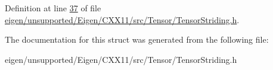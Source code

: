 Definition at line \hyperlink{eigen_2unsupported_2_eigen_2_c_x_x11_2src_2_tensor_2_tensor_striding_8h_source_l00037}{37} of file \hyperlink{eigen_2unsupported_2_eigen_2_c_x_x11_2src_2_tensor_2_tensor_striding_8h_source}{eigen/unsupported/\+Eigen/\+C\+X\+X11/src/\+Tensor/\+Tensor\+Striding.\+h}.



The documentation for this struct was generated from the following file\+:\begin{DoxyCompactItemize}
\item 
eigen/unsupported/\+Eigen/\+C\+X\+X11/src/\+Tensor/\+Tensor\+Striding.\+h\end{DoxyCompactItemize}
